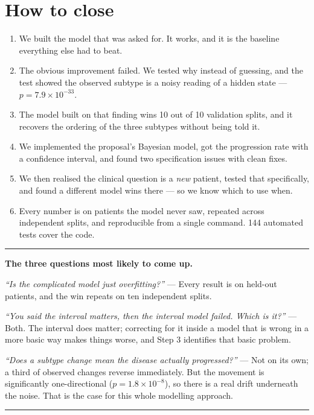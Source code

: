 \documentclass[11pt,a4paper]{article}
\newenvironment{found}
  {\begin{center}\begin{minipage}{0.95\textwidth}%
   \vspace{4pt}\hrule\vspace{6pt}\small}
  {\vspace{6pt}\hrule\vspace{4pt}\end{minipage}\end{center}}
\begin{document}
\section{How to close}

\begin{enumerate}
  \item We built the model that was asked for. It works, and it is the baseline
        everything else had to beat.

  \item The obvious improvement failed. We tested why instead of guessing, and
        the test showed the observed subtype is a noisy reading of a hidden
        state --- $p = 7.9\times10^{-33}$.

  \item The model built on that finding wins 10 out of 10 validation splits, and
        it recovers the ordering of the three subtypes without being told it.

  \item We implemented the proposal's Bayesian model, got the progression rate
        with a confidence interval, and found two specification issues with
        clean fixes.

  \item We then realised the clinical question is a \emph{new} patient, tested
        that specifically, and found a different model wins there --- so we know
        which to use when.

  \item Every number is on patients the model never saw, repeated across
        independent splits, and reproducible from a single command. 144 automated
        tests cover the code.
\end{enumerate}

\vspace{0.8em}
\begin{found}
\textbf{The three questions most likely to come up.}

\smallskip
\emph{``Is the complicated model just overfitting?''} --- Every result is on
held-out patients, and the win repeats on ten independent splits.

\smallskip
\emph{``You said the interval matters, then the interval model failed. Which is it?''}
--- Both. The interval does matter; correcting for it inside a model that is
wrong in a more basic way makes things worse, and Step 3 identifies that basic
problem.

\smallskip
\emph{``Does a subtype change mean the disease actually progressed?''} --- Not on
its own; a third of observed changes reverse immediately. But the movement is
significantly one-directional ($p = 1.8\times10^{-8}$), so there is a real drift
underneath the noise. That is the case for this whole modelling approach.
\end{found}
\end{document}
